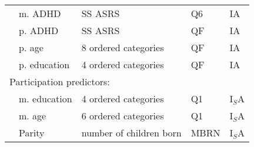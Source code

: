 \documentclass[a4paper]{article}
\begin{document}
\begin{table}
\begin{tabular}{lllll}
			& m. ADHD & SS ASRS & Q6 & IA \\ 
			& p. ADHD & SS ASRS & QF & IA \\
			& p. age & 8 ordered categories & QF & IA \\ 
			& p. education & 4 ordered categories & QF & IA \\ 
			\multicolumn{5}{l}{Participation predictors:} \\ 
			& m. education & 4 ordered categories & Q1  & I$_S$A\\ 
			& m. age & 6 ordered categories & Q1  & I$_S$A\\ 
			& Parity & number of children born & MBRN  & I$_S$A\\ 
			\hline
		\end{tabular}
	\end{table}
\end{document}
